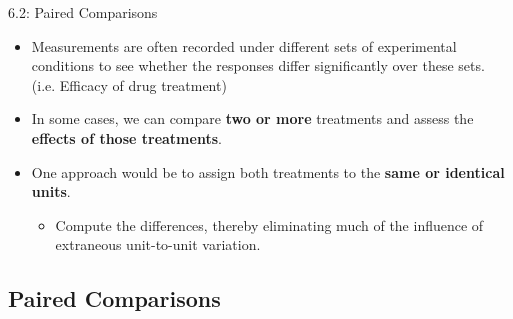 \documentclass[8pt]{beamer}
\begin{document}
\begin{frame}{6.2: Paired Comparisons} %
        \begin{itemize}
            \item Measurements are often recorded under different sets of experimental conditions to see whether the responses differ significantly over these sets. (i.e. Efficacy of drug treatment)
            \item In some cases, we can compare \textbf{two or more} treatments and assess the \textbf{effects of those treatments}. 
            \item One approach would be to assign both treatments to the \textbf{same or identical units}.
            \begin{itemize}
                \item Compute the differences, thereby eliminating much of the influence of extraneous unit-to-unit variation. 
            \end{itemize}
        \end{itemize}
\end{frame}


\subsection{Paired Comparisons}
\end{document}
